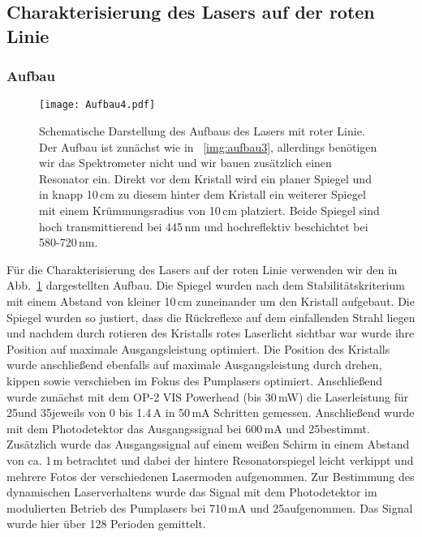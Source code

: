\subsection{Charakterisierung des Lasers auf der roten Linie}

\subsubsection{Aufbau}

\begin{figure}[H]
\begin{center}
  \texttt{[image: Aufbau4.pdf]}
  \caption{Schematische Darstellung des Aufbaus des Lasers mit roter Linie. Der Aufbau ist zunächst wie in ~\ref{img:aufbau3}, allerdings benötigen wir das Spektrometer nicht und wir bauen zusätzlich einen Resonator ein.
   Direkt vor dem Kristall wird ein planer Spiegel und in knapp 10\,cm zu diesem hinter dem Kristall ein weiterer Spiegel mit einem Krümmungsradius von 10\,cm platziert. Beide Spiegel sind hoch transmittierend bei 445\,nm und hochreflektiv beschichtet bei 580-720\,nm.}
  \label{img:aufbau4}
\end{center}
\end{figure}

Für die Charakterisierung des Lasers auf der roten Linie verwenden wir den in Abb.~\ref{img:aufbau4} dargestellten Aufbau. Die Spiegel wurden nach dem Stabilitätskriterium mit einem Abstand von kleiner 10\,cm zuneinander um den Kristall aufgebaut. Die Spiegel wurden so justiert, dass die Rückreflexe auf dem einfallenden Strahl liegen und nachdem durch rotieren des Kristalls rotes Laserlicht sichtbar war wurde ihre Position auf maximale Ausgangsleistung optimiert. Die Position des Kristalls wurde anschließend ebenfalls auf maximale Ausgangsleistung durch drehen, kippen sowie verschieben im Fokus des Pumplasers optimiert. 
Anschließend wurde zunächst mit dem OP-2 VIS Powerhead (bis 30\,mW) die Laserleistung für 25\grad und 35\grad jeweils von 0 bis 1.4\,A in 50\,mA Schritten gemessen.
Anschließend wurde mit dem Photodetektor das Ausgangssignal bei 600\,mA und 25\grad bestimmt. Zusätzlich wurde das Ausgangssignal auf einem weißen Schirm in einem Abstand von ca. 1\,m betrachtet und dabei der hintere Resonatorspiegel leicht verkippt und mehrere Fotos der verschiedenen Lasermoden aufgenommen. 
Zur Bestimmung des dynamischen Laserverhaltens wurde das Signal mit dem Photodetektor im modulierten Betrieb des Pumplasers bei 710\,mA und 25\grad aufgenommen. Das Signal wurde hier über 128 Perioden gemittelt.




